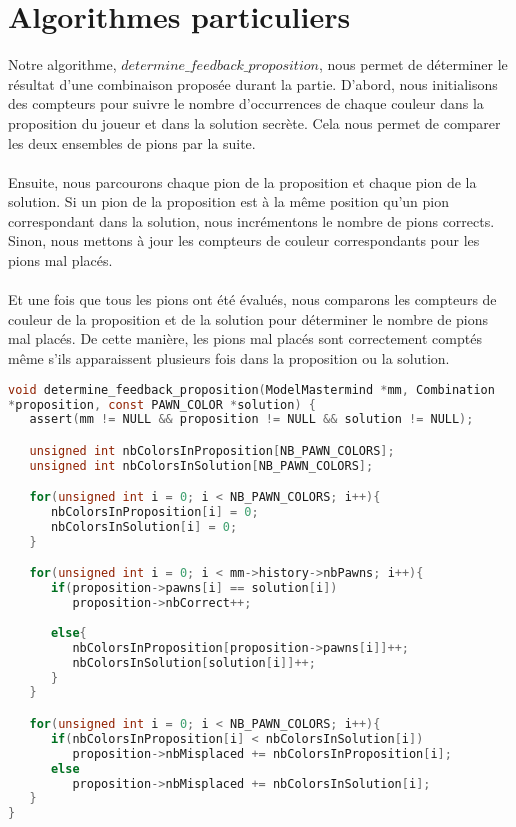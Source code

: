
\section{Algorithmes particuliers}

Notre algorithme, $determine\_feedback\_proposition$, nous permet de déterminer le résultat d'une combinaison proposée durant la partie. D'abord, nous initialisons des compteurs pour suivre le nombre d'occurrences de chaque couleur dans la proposition du joueur et dans la solution secrète. Cela nous permet de comparer les deux ensembles de pions par la suite.
\\\\
Ensuite, nous parcourons chaque pion de la proposition et chaque pion de la solution. Si un pion de la proposition est à la même position qu'un pion correspondant dans la solution, nous incrémentons le nombre de pions corrects. Sinon, nous mettons à jour les compteurs de couleur correspondants pour les pions mal placés.
\\\\
Et une fois que tous les pions ont été évalués, nous comparons les compteurs de couleur de la proposition et de la solution pour déterminer le nombre de pions mal placés. De cette manière, les pions mal placés sont correctement comptés même s'ils apparaissent plusieurs fois dans la proposition ou la solution.

\begin{lstlisting}[language=C]
void determine_feedback_proposition(ModelMastermind *mm, Combination 
*proposition, const PAWN_COLOR *solution) {
   assert(mm != NULL && proposition != NULL && solution != NULL);

   unsigned int nbColorsInProposition[NB_PAWN_COLORS];
   unsigned int nbColorsInSolution[NB_PAWN_COLORS];

   for(unsigned int i = 0; i < NB_PAWN_COLORS; i++){
      nbColorsInProposition[i] = 0;
      nbColorsInSolution[i] = 0;
   }

   for(unsigned int i = 0; i < mm->history->nbPawns; i++){
      if(proposition->pawns[i] == solution[i])
         proposition->nbCorrect++;
       
      else{
         nbColorsInProposition[proposition->pawns[i]]++;
         nbColorsInSolution[solution[i]]++;
      }
   }

   for(unsigned int i = 0; i < NB_PAWN_COLORS; i++){
      if(nbColorsInProposition[i] < nbColorsInSolution[i])
         proposition->nbMisplaced += nbColorsInProposition[i];
      else
         proposition->nbMisplaced += nbColorsInSolution[i];
   }
}
\end{lstlisting}


